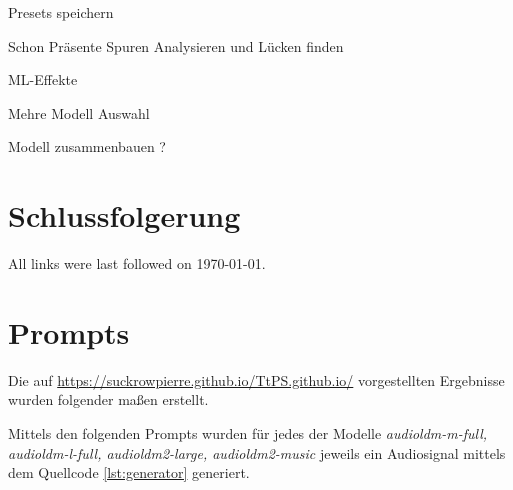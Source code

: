 \documentclass[
  a4paper,  %
  twoside,  %
  bibliography=totoc,
  headsepline,
  cleardoublepage=empty,
  parskip=half,
  draft=false
]{scrbook}
\begin{document}
Presets speichern 

Schon Präsente Spuren Analysieren und Lücken finden 

ML-Effekte

Mehre Modell Auswahl 

Modell zusammenbauen ? 





\chapter{Schlussfolgerung}
\label{sec:conclusion}


\printbibliography

All links were last followed on \today{}.

\appendix

\chapter{Prompts}
\label{chap:prompts}

Die auf \url{https://suckrowpierre.github.io/TtPS.github.io/}\cite{pierre-louis_suckrow_text-zu-spielbarem-klang_nodate} vorgestellten Ergebnisse wurden folgender maßen erstellt.

Mittels den folgenden Prompts wurden für jedes der Modelle \emph{audioldm-m-full, audioldm-l-full, audioldm2-large, audioldm2-music} \cite{liu_audioldm_2023,liu_audioldm2_2023} jeweils ein Audiosignal mittels dem Quellcode \ref{lst:generator}\cite{pierre-louis_suckrow_thesismodelsresultsgenerator_2023} generiert. 
\end{document}
